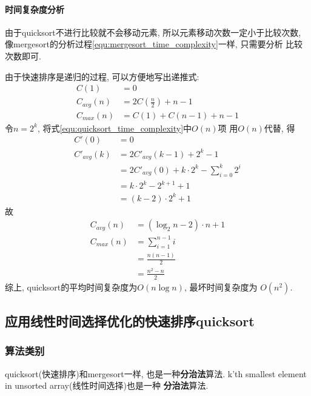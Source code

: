 \paragraph{时间复杂度分析}
由于quicksort不进行比较就不会移动元素, 所以元素移动次数一定小于比较次数,
像mergesort的分析过程\ref{equ:mergesort_time_complexity}一样, 只需要分析
比较次数即可.\par
由于快速排序是递归的过程, 可以方便地写出递推式:
\begin{align}
	\label{equ:quicksort_time_complexity}
	C(1)       & = 0                        \nonumber \\
	C_{avg}(n) & = 2C(\frac{n}{2}) + n - 1  \nonumber \\
	C_{max}(n) & = C(1) + C(n - 1) + n - 1  \nonumber
\end{align}
令\(n=2^k\), 将式\ref{equ:quicksort_time_complexity}中$O(n)$项
用$O(n)$代替, 得
\begin{align}
	C'(0)       & = 0                                           \nonumber \\
	C'_{avg}(k) & = 2C'_{avg}(k-1)+2^k-1                        \nonumber \\
	            & = 2C'_{avg}(0)+k\cdot 2^k - \sum_{i=0}^k 2^i  \nonumber \\
	            & = k\cdot 2^k - 2^{k+1}+1                      \nonumber \\
	            & = (k-2)\cdot 2^k + 1 \nonumber
\end{align}
故
\begin{align}
	C_{avg}(n) & = (\log_2{n}-2)\cdot n+1  \nonumber \\
	C_{max}(n) & = \sum_{i=1}^{n-1}i       \nonumber \\
	           & = \frac{n(n-1)}{2}        \nonumber \\
	           & =\frac{n^2-n}{2}          \nonumber
\end{align}
综上, quicksort的平均时间复杂度为$O(n\log n)$, 最坏时间复杂度为
$O(n^2)$.

\subsection{应用线性时间选择优化的快速排序quicksort}
\subsubsection{算法类别}
quicksort(快速排序)和mergesort一样, 也是一种\textbf{分治法}算法.
k'th smallest element in unsorted array(线性时间选择)也是一种
\textbf{分治法}算法.

